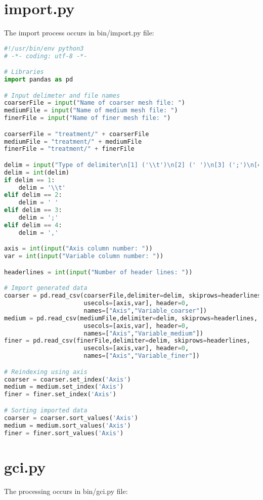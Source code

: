 \documentclass[../main.tex]{subfiles}
\begin{document}
\section{import.py}
The import process occurs in bin/import.py file:
\begin{lstlisting}[language=python]
#!/usr/bin/env python3
# -*- coding: utf-8 -*-

# Libraries
import pandas as pd

# Input delimeter and file names
coarserFile = input("Name of coarser mesh file: ")
mediumFile = input("Name of medium mesh file: ")
finerFile = input("Name of finer mesh file: ")

coarserFile = "treatment/" + coarserFile
mediumFile = "treatment/" + mediumFile
finerFile = "treatment/" + finerFile

delim = input("Type of delimiter\n[1] ('\\t')\n[2] (' ')\n[3] (';')\n[4] (',')\nChosen option: ")
delim = int(delim)
if delim == 1:
    delim = '\\t'
elif delim == 2:
    delim = ' '
elif delim == 3:
    delim = ';'
elif delim == 4:
    delim = ','

axis = int(input("Axis column number: "))
var = int(input("Variable column number: "))

headerlines = int(input("Number of header lines: "))

# Import generated data
coarser = pd.read_csv(coarserFile,delimiter=delim, skiprows=headerlines,
                      usecols=[axis,var], header=0,
                      names=["Axis","Variable_coarser"])
medium = pd.read_csv(mediumFile,delimiter=delim, skiprows=headerlines,
                      usecols=[axis,var], header=0,
                      names=["Axis","Variable_medium"])
finer = pd.read_csv(finerFile,delimiter=delim, skiprows=headerlines,
                      usecols=[axis,var], header=0,
                      names=["Axis","Variable_finer"])

# Reindexing using axis
coarser = coarser.set_index('Axis')
medium = medium.set_index('Axis')
finer = finer.set_index('Axis')

# Sorting imported data
coarser = coarser.sort_values('Axis')
medium = medium.sort_values('Axis')
finer = finer.sort_values('Axis')
\end{lstlisting}
\section{gci.py}
The processing occurs in bin/gci.py file:
\end{document}
